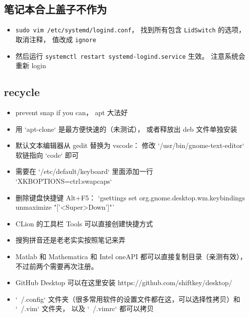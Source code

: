 \subsection{笔记本合上盖子不作为}
\begin{itemize}
\item \verb|sudo vim /etc/systemd/logind.conf|， 找到所有包含 \verb|LidSwitch| 的选项， 取消注释， 值改成 \verb|ignore|
\item 然后运行 \verb|systemctl restart systemd-logind.service| 生效。 注意系统会重新 login
\end{itemize}


\subsection{recycle}
\begin{itemize}
\item prevent snap if you can， apt 大法好
\item 用 `apt-clone` 是最方便快速的（未测试）， 或者释放出 deb 文件单独安装
\item 默认文本编辑器从 gedit 替换为 vscode： 修改 `/usr/bin/gnome-text-editor` 软链指向 `code` 即可
\item 需要在 `/etc/default/keyboard` 里面添加一行 `XKBOPTIONS=ctrl:swapcaps`
\item 删除键盘快捷键 Alt+F5： `gsettings set org.gnome.desktop.wm.keybindings unmaximize "['<Super>Down']"`
\item CLion 的工具栏 Tools 可以直接创建快捷方式
\item 搜狗拼音还是老老实实按照笔记来弄
\item Matlab 和 Mathematica 和 Intel oneAPI 都可以直接复制目录（亲测有效）， 不过前两个需要再次注册。
\item GitHub Desktop 可以在这里安装 https://github.com/shiftkey/desktop/
\item `~/.config` 文件夹（很多常用软件的设置文件都在这，可以选择性拷贝）和 `~/.vim` 文件夹， 以及 `~/.vimrc` 都可以拷贝
\end{itemize}
